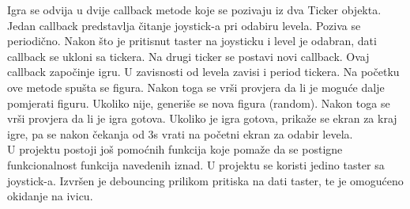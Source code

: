 \documentclass[a4paper,12pt,twoside]{article}
\begin{document}
\newpage
\noindent Igra se odvija u dvije callback metode koje se pozivaju iz dva Ticker objekta. Jedan callback predstavlja čitanje joystick-a pri odabiru levela. Poziva se periodično. Nakon što je pritisnut taster na joysticku i level je odabran, dati callback se ukloni sa tickera. Na drugi ticker se postavi novi callback. Ovaj callback započinje igru. U zavisnosti od levela zavisi i period tickera. Na početku ove metode spušta se figura. Nakon toga se vrši provjera da li je moguće dalje pomjerati figuru. Ukoliko nije, generiše se nova figura (random). Nakon toga se vrši provjera da li je igra gotova. Ukoliko je igra gotova, prikaže se ekran za kraj igre, pa se nakon čekanja od 3s vrati na početni ekran za odabir levela. \\
U projektu postoji još pomoćnih funkcija koje pomaže da se postigne funkcionalnost funkcija navedenih iznad. U projektu se koristi jedino taster sa joystick-a. Izvršen je debouncing prilikom pritiska na dati taster, te je omogućeno okidanje na ivicu. \\
\end{document}
